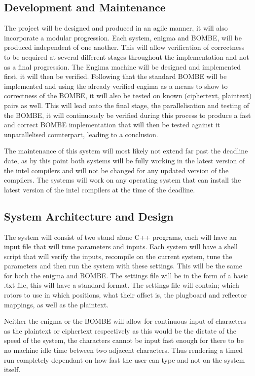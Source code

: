 \documentclass[12pt,a4paper]{article}
\begin{document}
\subsection{Development and Maintenance}

The project will be designed and produced in an agile manner, it will also incorporate a modular progression. Each system, enigma and BOMBE, will be produced independent of one another. This will allow verification of correctness to be acquired at several different stages throughout the implementation and not as a final progression. The Engima machine will be designed and implemented first, it will then be verified. Following that the standard BOMBE will be implemented and using the already verified engima as a means to show to correctness of the BOMBE, it will also be tested on known (ciphertext, plaintext) pairs as well. This will lead onto the final stage, the parallelisation and testing of the BOMBE, it will continuously be verified during this process to produce a fast and correct BOMBE implementation that will then be tested against it unparallelised counterpart, leading to a conclusion.

The maintenance of this system will most likely not extend far past the deadline date, as by this point both systems will be fully working in the latest version of the intel compilers and will not be changed for any updated version of the compilers. The systems will work on any operating system that can install the latest version of the intel compilers at the time of the deadline.

\subsection{System Architecture and Design}

The system will consist of two stand alone C++ programs, each will have an input file that will tune parameters and inputs. Each system will have a shell script that will verify the inputs, recompile on the current system, tune the parameters and then run the system with these settings. This will be the same for both the enigma and BOMBE. The settings file will be in the form of a basic .txt file, this will have a standard format. The settings file will contain; which rotors to use in which positions, what their offset is, the plugboard and reflector mappings, as well as the plaintext. 

Neither the enigma or the BOMBE will allow for continuous input of characters as the plaintext or ciphertext respectively as this would be the dictate of the speed of the system, the characters cannot be input fast enough for there to be no machine idle time between two adjacent characters. Thus rendering a timed run completely dependant on how fast the user can type and not on the system itself.
\end{document}
